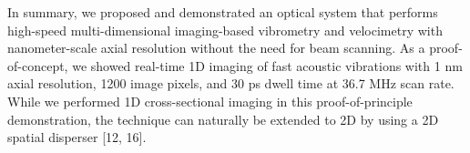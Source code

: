 In summary, we proposed and demonstrated an optical system that performs high-speed multi-dimensional imaging-based vibrometry and velocimetry with nanometer-scale axial resolution without the need for beam scanning. As a proof-of-concept, we showed real-time 1D imaging of fast acoustic vibrations with 1 nm axial resolution, 1200 image pixels, and 30 ps dwell time at 36.7 MHz scan rate. While we performed 1D cross-sectional imaging in this proof-of-principle demonstration, the technique can naturally be extended to 2D by using a 2D spatial disperser [12, 16].

